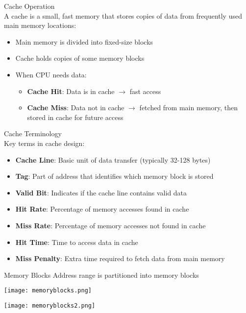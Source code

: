 \begin{concept}{Cache Operation}\\
A cache is a small, fast memory that stores copies of data from frequently used main memory locations:
\begin{itemize}
    \item Main memory is divided into fixed-size blocks
    \item Cache holds copies of some memory blocks
    \item When CPU needs data:
    \begin{itemize}
        \item \textbf{Cache Hit}: Data is in cache $\rightarrow$ fast access
        \item \textbf{Cache Miss}: Data not in cache $\rightarrow$ fetched from main memory, then stored in cache for future access
    \end{itemize}
\end{itemize}
\end{concept}

\begin{theorem}{Cache Terminology}\\
Key terms in cache design:
\begin{itemize}
    \item \textbf{Cache Line}: Basic unit of data transfer (typically 32-128 bytes)
    \item \textbf{Tag}: Part of address that identifies which memory block is stored
    \item \textbf{Valid Bit}: Indicates if the cache line contains valid data
    \item \textbf{Hit Rate}: Percentage of memory accesses found in cache
    \item \textbf{Miss Rate}: Percentage of memory accesses not found in cache
    \item \textbf{Hit Time}: Time to access data in cache
    \item \textbf{Miss Penalty}: Extra time required to fetch data from main memory
\end{itemize}
\end{theorem}

\begin{corollary}{Memory Blocks}
    Address range is partitioned into memory blocks

    \begin{minipage}{0.5\linewidth}
    \texttt{[image: memoryblocks.png]}
    \end{minipage}
    \begin{minipage}{0.5\linewidth}
    \texttt{[image: memoryblocks2.png]}
    \end{minipage}

\end{corollary}

